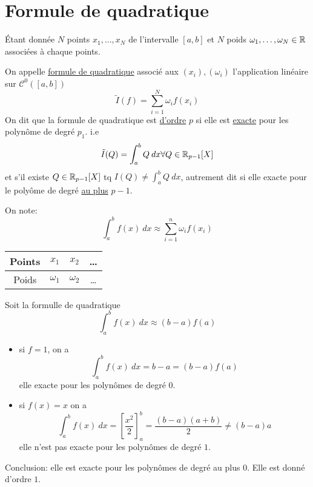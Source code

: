 \section{Formule de quadratique}
\begin{definition}
    Étant donnée $N$ points  $x_1, \ldots, x_N$ de l'intervalle $[a, b]$  et $N$ poids  $\omega_1, \ldots, \omega_N \in \mathbb{R}$ associées à chaque points.
    \par
    On appelle \underline{formule de quadratique} associé aux $(x_i),(\omega_i)$ l'application linéaire sur  $\mathcal{C}^0([a, b])$
     \[
         \tilde{I}(f) = \sum_{i=1}^{N} \omega_i f(x_i)
    \] 
    On dit que la formule de quadratique est \underline{d'ordre} $p$ si elle est \underline{exacte} pour les polynôme de degré  $p_1$. i.e
     \[
         \tilde{I}(Q) = \int_{{a}}^{{b}} {Q} \: d{x} {} \forall Q \in \mathbb{R}_{p-1}[X]
    \] 
    et s'il existe $Q \in \mathbb{R}_{p-1}[X]$ tq $I(Q) \neq \int_{{a}}^{{b}} {Q} \: d{x}$, autrement dit si elle exacte pour le polyôme de degré \underline{au plus} $p-1$.
\end{definition}
\begin{remark}
   On note:
   \[
   \int_{{a}}^{{b}} {f(x)} \: d{x} \approx \sum_{i=1}^{n} \omega_i f(x_i)
   \] 
   \begin{center}
    \begin{tabular}{| c | c | c | c |}
        \hline
        Points & $x_1$ &  $x_2$ &  \ldots \\  
        \hline
        Poids & $\omega_1$ &  $\omega_2$ &  \ldots \\
        \hline
    \end{tabular}
\end{center}
\end{remark}
\begin{eg}
   Soit la formulle de quadratique 
   \[
   \int_{{a}}^{{b}} {f(x)} \: d{x} \approx (b-a)f(a)
   \] 
   \begin{itemize}
       \item si $f = 1$, on a  
           \[
               \int_{{a}}^{{b}} {f(x)} \: d{x} {} = b - a = (b-a)f(a)
           \] 
           elle exacte pour les polynômes de degré 0.
        \item si $f(x) = x$ on a
             \[
                 \int_{{a}}^{{b}} {f(x)} \: d{x} = \left[ \frac{x^2}{2} \right]_{a}^{b}  = \frac{(b-a)(a+b)}{2} \neq (b-a)a
            \] 
            elle n'est pas exacte pour les polynômes de degré $1$.
   \end{itemize}
   Conclusion: elle est exacte pour les polynômes de degré au plus 0. Elle est donné d'ordre $1$.
\end{eg}

